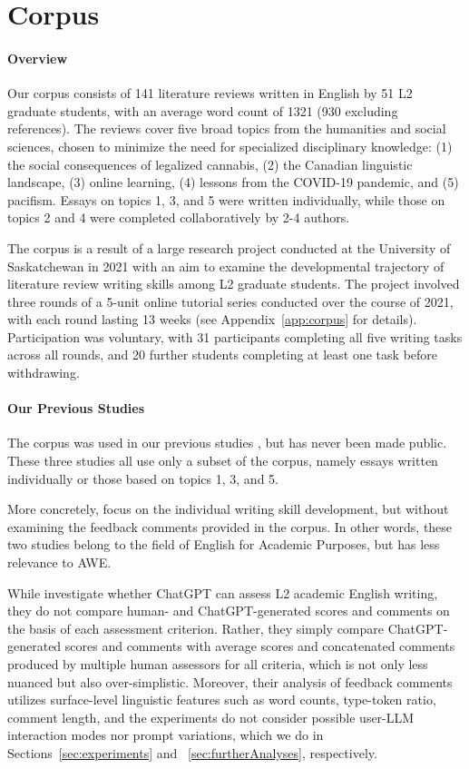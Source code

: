 \section{Corpus\label{sec:corpus}}


\paragraph{Overview} Our corpus consists of 141 literature reviews written in English by 51 L2 graduate students, with an average word count of 1321 (930 excluding references). The reviews cover five broad topics from the humanities and social sciences, chosen to minimize the need for specialized disciplinary knowledge: (1) the social consequences of legalized cannabis, (2) the Canadian linguistic landscape, (3) online learning, (4) lessons from the COVID-19 pandemic, and (5) pacifism. Essays on topics 1, 3, and 5 were written individually, while those on topics 2 and 4 were completed collaboratively by 2-4 authors.


The corpus is a result of a large research project conducted at the University of Saskatchewan in 2021 with an aim to examine the developmental trajectory of literature review writing skills among L2 graduate students. The project involved three rounds of a 5-unit online tutorial series conducted over the course of 2021, with each round lasting 13 weeks (see Appendix~\ref{app:corpus} for details). Participation was voluntary, with 31 participants completing all five writing tasks across all rounds, and 20 further students completing at least one task before withdrawing. 


\paragraph{Our Previous Studies} The corpus was used in our previous studies \citep{li2023assessment, li2023developing, makarova2024can}, but has never been made public. These three studies all use only a subset of the corpus, namely essays written individually or those based on topics 1, 3, and 5.   

More concretely, \citet{li2023assessment, li2023developing} focus on the individual writing skill development, but without examining the feedback comments provided in the corpus. In other words, these two studies belong to the field of English for Academic Purposes, but has less relevance to AWE. 

While \citet{makarova2024can} investigate whether ChatGPT can assess L2 academic English writing, they do not compare human- and ChatGPT-generated scores and comments on the basis of each assessment criterion. Rather, they simply compare ChatGPT-generated scores and comments with average scores and concatenated comments produced by multiple human assessors for all criteria, which is not only less nuanced but also over-simplistic. Moreover, their analysis of feedback comments utilizes surface-level linguistic features such as word counts, type-token ratio, comment length, and the experiments do not consider possible user-LLM interaction modes nor prompt variations, which we do in Sections~\ref{sec:experiments} and ~\ref{sec:furtherAnalyses}, respectively. 

